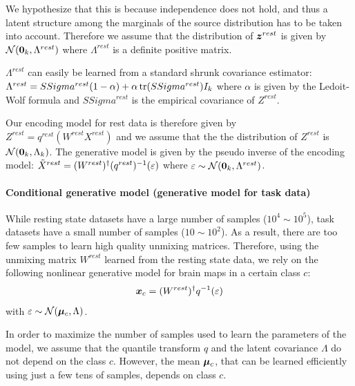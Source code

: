 We hypothesize that this is because independence does not hold, and
thus a latent structure among the marginals of the source distribution has to be taken into account. Therefore we assume that the distribution of $\boldsymbol{z}^{rest}$ is given
by $\mathcal{N}({\boldsymbol{0}}_k, \Lambda^{rest})$ where $\Lambda^{rest}$ is a definite positive matrix.

$\Lambda^{rest}$ can easily be learned from a standard shrunk covariance
estimator: $\Lambda^{rest} = SSigma^{rest} (1 - \alpha) + \alpha \mathop{\mathrm{tr}}(SSigma^{rest}) I_k$ where
$\alpha$ is given by the Ledoit-Wolf formula \cite{ledoit2004well} and
$SSigma^{rest}$ is the empirical covariance of $Z^{rest}$.

Our encoding model for rest data is therefore given by \\ 
$Z^{rest} =
q^{rest}(W^{rest} X^{rest})$ and we assume that the the
distribution of $Z^{rest}$ is $\mathcal{N}({\boldsymbol{0}}_k, \Lambda_k)$.
The generative model is given by the pseudo inverse of the encoding model:
$\tilde{X}^{rest} = (W^{rest})^{\dagger} (q^{rest})^{-1}(\varepsilon)$ where $\varepsilon \sim
\mathcal{N}({\boldsymbol{0}}_k, \Lambda^{rest})$. 


\paragraph{Conditional generative model (generative model for task data)}
While resting state datasets have a large number of samples ($10^4 \sim 10^5$), task datasets   have a small number of samples ($10 \sim 10^2$). As a result, there are too few samples to learn high quality unmixing matrices. 
%
Therefore, using  the unmixing matrix $W^{rest}$ learned from the resting state data, we rely on the following nonlinear generative model for brain maps in a certain class $c$:
\begin{equation}
  \boldsymbol{x}_c = (W^{rest})^{\dagger} q^{-1}(\varepsilon)
\end{equation}
with $\varepsilon \sim \mathcal{N}(\boldsymbol{\mu}_c, \Lambda)$.

In order to maximize the number of samples used to learn the parameters of the
model, we assume that the quantile transform $q$ and the latent covariance
$\Lambda$ do not depend on the class $c$. However, the mean $\boldsymbol{\mu}_c$, that can be learned efficiently using just a few tens of samples, depends on class $c$.

